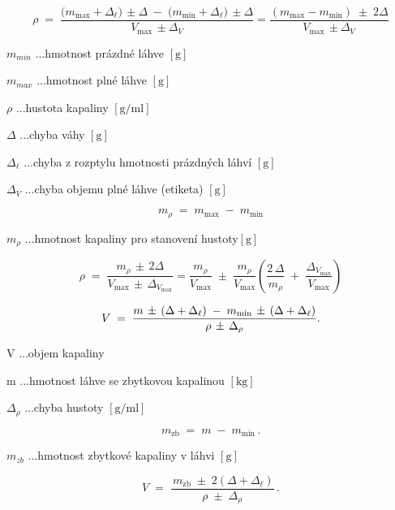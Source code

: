 \[
\rho \;=\;
\frac{\bigl(m_{\max}+\Delta_{\ell}\bigr)\,\pm\Delta
      \;-\;\bigl(m_{\min}+\Delta_{\ell}\bigr)\,\pm\Delta}
     {V_{\max}\,\pm\Delta_V} = \frac{(m_{\max}-m_{\min})\;\pm\;2\Delta}
     {V_{\max}\,\pm\Delta_V}
\]

\(m_{min}\) ...hmotnost prázdné láhve \([\mathrm{g}]\)

\(m_{max}\) ...hmotnost plné láhve \([\mathrm{g}]\)

\(\rho\) ...hustota kapaliny \([\mathrm{g/ml}]\)

\(\Delta\) ...chyba váhy \([\mathrm{g}]\)

\(\Delta_\ell\) ...chyba z rozptylu hmotnosti prázdných láhví \([\mathrm{g}]\)

\(\Delta_V\) ...chyba objemu plné láhve (etiketa) \([\mathrm{g}]\)

\[
m_{\rho} \;=\; m_{\max} \;-\; m_{\min}
\]

\(m_{\rho}\) ...hmotnost kapaliny pro stanovení hustoty\([\mathrm{g}]\)

\[
\rho \;=\;
\frac{m_{\rho} \,\pm\, 2\Delta}
     {V_{\max} \,\pm\, \Delta_{V_{\max}}} = \frac{m_{\rho}}{V_{\max}}
\;\pm\;
\frac{m_{\rho}}{V_{\max}}
\left(
   \frac{2\,\Delta}{m_{\rho}} \;+\; \frac{\Delta_{V_{\max}}}{V_{\max}}
\right)
\]


\[
V \;=\;
\frac{%
      m \,\pm\, (\Delta + \Delta_\ell)
      \;-\;
      m_{\min} \,\pm\, (\Delta + \Delta_\ell)
     }{%
      \rho \,\pm\, \Delta_\rho
     }.
\]

V ...objem kapaliny

m ...hmotnost láhve se zbytkovou kapalinou \([\mathrm{kg}]\)

\(\Delta_\rho\) ...chyba hustoty \([\mathrm{g/ml}]\)

\[
m_{\mathrm{zb}} \;=\; m \;-\; m_{\min}\,.
\]

\(m_{zb}\) ...hmotnost zbytkové kapaliny v láhvi \([\mathrm{g}]\)

\[
V \;=\;
\frac{\,m_{\mathrm{zb}} \;\pm\; 2(\Delta + \Delta_\ell)}
     {\rho \;\pm\; \Delta_\rho}\,.
\]

\begin{center}    
\end{center}

